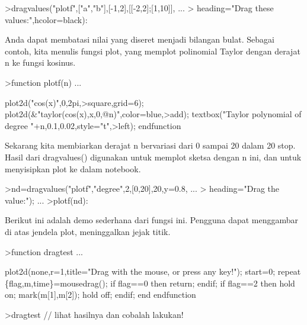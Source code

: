 \documentclass[a4paper,10pt]{article}
\begin{document}
\begin{eulernotebook}
\begin{eulercomment}
\begin{eulercomment}
\begin{eulerprompt}
>dragvalues("plotf",["a","b"],[-1,2],[[-2,2];[1,10]], ...
>  heading="Drag these values:",hcolor=black):
\end{eulerprompt}
\begin{eulercomment}
Anda dapat membatasi nilai yang diseret menjadi bilangan bulat.
Sebagai contoh, kita menulis fungsi plot, yang memplot polinomial
Taylor dengan derajat n ke fungsi kosinus.
\end{eulercomment}
\begin{eulerprompt}
>function plotf(n) ...
\end{eulerprompt}
\begin{eulerudf}
  plot2d("cos(x)",0,2pi,>square,grid=6);
  plot2d(&"taylor(cos(x),x,0,@n)",color=blue,>add);
  textbox("Taylor polynomial of degree "+n,0.1,0.02,style="t",>left);
  endfunction
\end{eulerudf}
\begin{eulercomment}
Sekarang kita membiarkan derajat n bervariasi dari 0 sampai 20 dalam
20 stop. Hasil dari dragvalues() digunakan untuk memplot sketsa dengan
n ini, dan untuk menyisipkan plot ke dalam notebook.
\end{eulercomment}
\begin{eulerprompt}
>nd=dragvalues("plotf","degree",2,[0,20],20,y=0.8, ...
>   heading="Drag the value:"); ...
>plotf(nd):
\end{eulerprompt}
\begin{eulercomment}
Berikut ini adalah demo sederhana dari fungsi ini. Pengguna dapat
menggambar di atas jendela plot, meninggalkan jejak titik.
\end{eulercomment}
\begin{eulerprompt}
>function dragtest ...
\end{eulerprompt}
\begin{eulerudf}
    plot2d(none,r=1,title="Drag with the mouse, or press any key!");
    start=0;
    repeat
      \{flag,m,time\}=mousedrag();
      if flag==0 then return; endif;
      if flag==2 then
        hold on; mark(m[1],m[2]); hold off;
      endif;
    end
  endfunction
\end{eulerudf}
\begin{eulerprompt}
>dragtest // lihat hasilnya dan cobalah lakukan!
\end{eulerprompt}

\end{eulercomment}
\end{eulercomment}
\end{eulernotebook}
\end{document}
